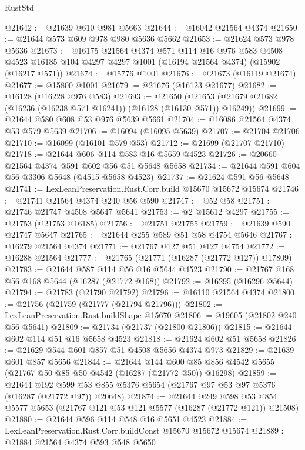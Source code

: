 \begin{lexlean}{RustStd}
\begin{coremodule}
@21642 := @21639 @610 @981 @5663
@21644 := @16042 @21564 @4374
@21650 := @21644 @573 @609 @978 @980 @5636 @5662
@21653 := @21624 @573 @978 @5636
@21673 := @16175
    @21564
    @4374
    @571
    @114
    @16
    @976
    @583
    @4508
    @4523
    @16185
    @104
    @4297
    @4297
    @1001
    (@16194 @21564 @4374)
    (@15902 (@16217 @571))
@21674 := @15776 @1001
@21676 := @21673 (@16119 @21674)
@21677 := @15800 @1001
@21679 := @21676 (@16123 @21677)
@21682 := @16128 (@16228 @976 @583)
@21693 := @21650
    (@21653 (@21679 @21682 (@16236 (@16238 @571 @16241)) (@16128 (@16130 @571)) @16249))
@21699 := @21644 @580 @608 @53 @976 @5639 @5661
@21704 := @16086 @21564 @4374 @53 @579 @5639
@21706 := @16094 (@16095 @5639)
@21707 := @21704 @21706
@21710 := @16099 (@16101 @579 @53)
@21712 := @21699 (@21707 @21710)
@21718 := @21644 @606 @114 @583 @16 @5659 @4523
@21726 := @20660 @21564 @4374 @591 @602 @56 @51 @5648 @5658
@21734 := @21644 @591 @604 @56 @3306 @5648 (@4515 @5658 @4523)
@21737 := @21624 @591 @56 @5648
@21741 := LexLeanPreservation.Rust.Corr.build @15670 @15672 @15674
@21746 := @21741 @21564 @4374 @240 @56 @590
@21747 := @52 @58
@21751 := @21746 @21747 @4508 @5647 @5641
@21753 := @2 @15612 @4297
@21755 := @21753 (@21753 @16185)
@21756 := @21751 @21755
@21759 := @21639 @590 @21747 @5647
@21765 := @21644 @255 @589 @51 @58 @4754 @5646
@21767 := @16279 @21564 @4374
@21771 := @21767 @127 @51 @127 @4754
@21772 := @16288 @21564
@21777 := @21765 (@21771 (@16287 (@21772 @127)) @17809)
@21783 := @21644 @587 @114 @56 @16 @5644 @4523
@21790 := @21767 @168 @56 @168 @5644 (@16287 (@21772 @168))
@21792 := @16295 (@16296 @5644)
@21794 := @21783 (@21790 @21792)
@21796 := @16110 @21564 @4374
@21800 := @21756 (@21759 (@21777 (@21794 @21796)))
@21802 := LexLeanPreservation.Rust.buildShape @15670
@21806 := @19605 (@21802 @240 @56 @5641)
@21809 := @21734 (@21737 (@21800 @21806))
@21815 := @21644 @602 @114 @51 @16 @5658 @4523
@21818 := @21624 @602 @51 @5658
@21826 := @21629 @544 @601 @857 @51 @4508 @5656 @4374 @973
@21829 := @21639 @601 @857 @5656
@21844 := @21644
    @144
    @600
    @85
    @856
    @4542
    @5655
    (@21767 @50 @85 @50 @4542 (@16287 (@21772 @50)) @16298)
@21859 := @21644
    @192
    @599
    @53
    @855
    @5376
    @5654
    (@21767 @97 @53 @97 @5376 (@16287 (@21772 @97)) @20648)
@21874 := @21644
    @249
    @598
    @53
    @854
    @5577
    @5653
    (@21767 @121 @53 @121 @5577 (@16287 (@21772 @121)) @21508)
@21880 := @21644 @596 @114 @548 @16 @5651 @4523
@21884 := LexLeanPreservation.Rust.Corr.buildConst @15670 @15672 @15674
@21889 := @21884 @21564 @4374 @593 @548 @5650

\end{coremodule}
\end{lexlean}

